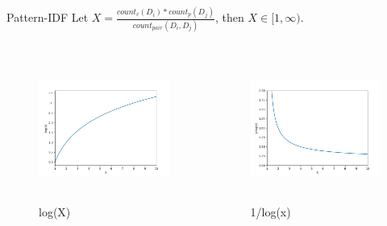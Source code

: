 \documentclass[aspectratio=169]{beamer}
\begin{document}
    \begin{frame}{Pattern-IDF}
      Let $X = \frac{count_c(D_i) * count_p(D_j)}{count_{pair}(D_i, D_j)}$, then $X \in [1, \infty)$.
      \begin{columns}[T] %
      \begin{column}{.48\textwidth}
      
      \begin{figure}
      \includegraphics[width=6.4cm,height=4.8cm]{pi1.png}
      \caption{log(X)}
      \end{figure}
      
      \end{column}%
      \hfill%
      \begin{column}{.48\textwidth}
      
        \begin{figure}
        \includegraphics[width=6.4cm,height=4.8cm]{pi2.png}
        \caption{1/log(x)}
        \end{figure}

      \end{column}%
      \end{columns}
    \end{frame}
\end{document}
